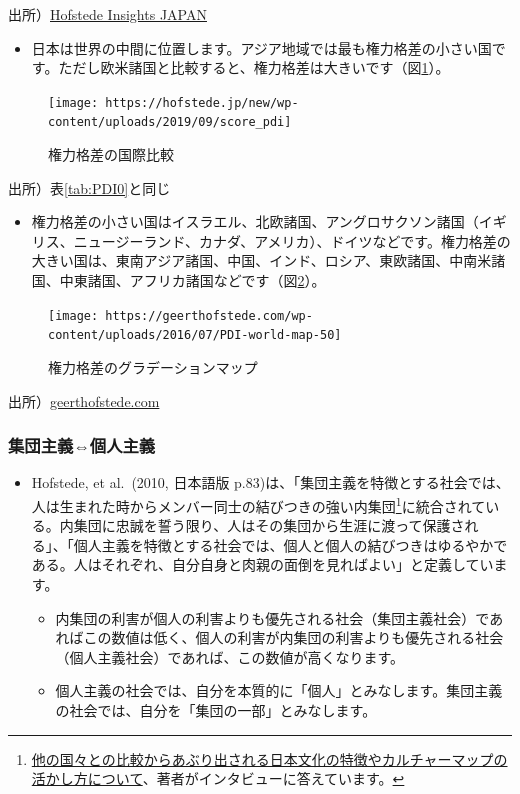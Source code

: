 \documentclass[
]{book}
\providecommand{\tightlist}{%
  \setlength{\itemsep}{0pt}\setlength{\parskip}{0pt}}
\begin{document}
出所）\href{https://hofstede.jp/6dimentionsmodel_pdi/}{Hofstede Insights JAPAN}

\begin{itemize}
\tightlist
\item
  日本は世界の中間に位置します。アジア地域では最も権力格差の小さい国です。ただし欧米諸国と比較すると、権力格差は大きいです（図\ref{fig:PDI1}）。
\end{itemize}

\begin{figure}
\texttt{[image: https://hofstede.jp/new/wp-content/uploads/2019/09/score\_pdi]} \caption{権力格差の国際比較}\label{fig:PDI1}
\end{figure}

出所）表\ref{tab:PDI0}と同じ

\begin{itemize}
\tightlist
\item
  権力格差の小さい国はイスラエル、北欧諸国、アングロサクソン諸国（イギリス、ニュージーランド、カナダ、アメリカ）、ドイツなどです。権力格差の大きい国は、東南アジア諸国、中国、インド、ロシア、東欧諸国、中南米諸国、中東諸国、アフリカ諸国などです（図\ref{fig:PDI2}）。
\end{itemize}

\begin{figure}
\texttt{[image: https://geerthofstede.com/wp-content/uploads/2016/07/PDI-world-map-50]} \caption{権力格差のグラデーションマップ}\label{fig:PDI2}
\end{figure}

出所）\href{https://geerthofstede.com/culture-geert-hofstede-gert-jan-hofstede/6d-model-of-national-culture/}{geerthofstede.com}

\hypertarget{ux96c6ux56e3ux4e3bux7fa9ux500bux4ebaux4e3bux7fa9}{%
\subsubsection{集団主義⇔個人主義}\label{ux96c6ux56e3ux4e3bux7fa9ux500bux4ebaux4e3bux7fa9}}

\begin{itemize}
\item
  Hofstede, et al.~(2010, 日本語版 p.83)は、「集団主義を特徴とする社会では、人は生まれた時からメンバー同士の結びつきの強い内集団\footnote{\href{https://plus.alc.co.jp/2018/01/meyer/}{他の国々との比較からあぶり出される日本文化の特徴やカルチャーマップの活かし方について}、著者がインタビューに答えています。}に統合されている。内集団に忠誠を誓う限り、人はその集団から生涯に渡って保護される」、「個人主義を特徴とする社会では、個人と個人の結びつきはゆるやかである。人はそれぞれ、自分自身と肉親の面倒を見ればよい」と定義しています。

  \begin{itemize}
  \item
    内集団の利害が個人の利害よりも優先される社会（集団主義社会）であればこの数値は低く、個人の利害が内集団の利害よりも優先される社会（個人主義社会）であれば、この数値が高くなります。
  \item
    個人主義の社会では、自分を本質的に「個人」とみなします。集団主義の社会では、自分を「集団の一部」とみなします。
  \end{itemize}
\end{itemize}
\end{document}
